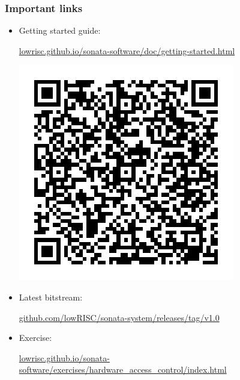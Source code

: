 \begin{frame}
  \frametitle{Important links}

  \begin{itemize}
    \item Getting started guide:

      \url{lowrisc.github.io/sonata-software/doc/getting-started.html}

      \includegraphics[height=0.4\textheight]{img/guide_qr.pdf}
    \item Latest bitstream:

      \url{github.com/lowRISC/sonata-system/releases/tag/v1.0}
    \item Exercise:

      \url{lowrisc.github.io/sonata-software/exercises/hardware_access_control/index.html}
  \end{itemize}
\end{frame}

